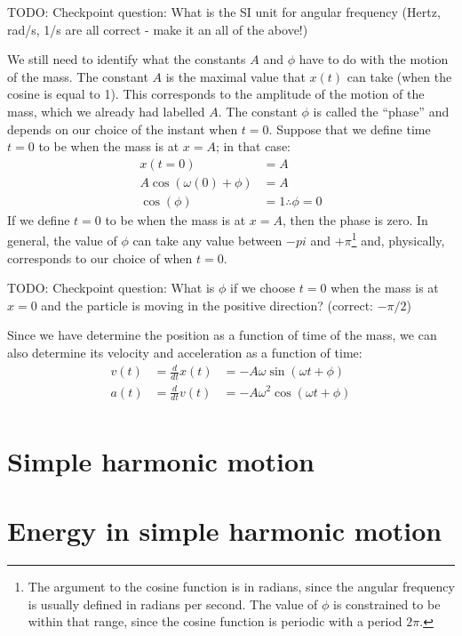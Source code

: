 TODO: Checkpoint question: What is the SI unit for angular frequency (Hertz, rad/s, 1/s are all correct - make it an all of the above!)

We still need to identify what the constants $A$ and $\phi$ have to do with the motion of the mass. The constant $A$ is the maximal value that $x(t)$ can take (when the cosine is equal to 1). This corresponds to the amplitude of the motion of the mass, which we already had labelled $A$. The constant $\phi$ is called the ``phase'' and depends on our choice of the instant when $t=0$. Suppose that we define time $t=0$ to be when the mass is at $x=A$; in that case:
\begin{align*}
x(t=0) &= A\\
A \cos(\omega (0) + \phi) &= A\\
\cos(\phi) &= 1
\therefore \phi = 0
\end{align*}
If we define $t=0$ to be when the mass is at $x=A$, then the phase is zero. In general, the value of $\phi$ can take any value between $-pi$ and $+\pi$\footnote{The argument to the cosine function is in radians, since the angular frequency is usually defined in radians per second. The value of $\phi$ is constrained to be within that range, since the cosine function is periodic with a period $2\pi$.} and, physically, corresponds to our choice of when $t=0$.

TODO: Checkpoint question: What is $\phi$ if we choose $t=0$ when the mass is at $x=0$ and the particle is moving in the positive direction? (correct: $- \pi/2$) 

Since we have determine the position as a function of time of the mass, we can also determine its velocity and acceleration as a function of time:
\begin{align*}
v(t) &= \frac{d}{dt}x(t) &= -A\omega\sin(\omega t + \phi)\\
a(t)&= \frac{d}{dt}v(t) &= -A\omega^2\cos(\omega t + \phi)\\
\end{align*}




\section{Simple harmonic motion}

\section{Energy in simple harmonic motion}

